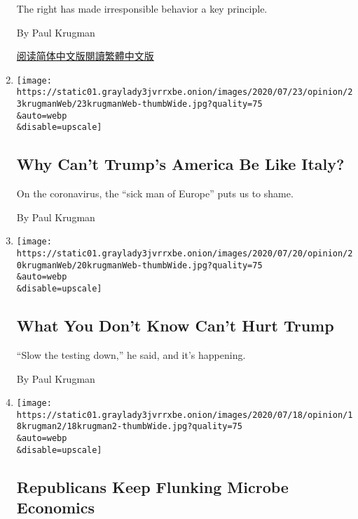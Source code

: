 \begin{enumerate}
  The right has made irresponsible behavior a key principle.

  By Paul Krugman

  \href{https://cn.nytimes3xbfgragh.onion/opinion/20200728/us-republicans-coronavirus/}{阅读简体中文版}\href{https://cn.nytimes3xbfgragh.onion/opinion/20200728/us-republicans-coronavirus/zh-hant/}{閱讀繁體中文版}
\item
  \href{/2020/07/23/opinion/us-italy-coronavirus.html}{}

  \texttt{[image: https://static01.graylady3jvrrxbe.onion/images/2020/07/23/opinion/23krugmanWeb/23krugmanWeb-thumbWide.jpg?quality=75\\\&auto=webp\\\&disable=upscale]}

  \hypertarget{why-cant-trumps-america-be-like-italy}{%
  \subsection{Why Can't Trump's America Be Like
  Italy?}\label{why-cant-trumps-america-be-like-italy}}

  On the coronavirus, the ``sick man of Europe'' puts us to shame.

  By Paul Krugman
\item
  \href{/2020/07/20/opinion/trump-coronavirus-testing.html}{}

  \texttt{[image: https://static01.graylady3jvrrxbe.onion/images/2020/07/20/opinion/20krugmanWeb/20krugmanWeb-thumbWide.jpg?quality=75\\\&auto=webp\\\&disable=upscale]}

  \hypertarget{what-you-dont-know-cant-hurt-trump}{%
  \subsection{What You Don't Know Can't Hurt
  Trump}\label{what-you-dont-know-cant-hurt-trump}}

  ``Slow the testing down,'' he said, and it's happening.

  By Paul Krugman
\item
  \href{/2020/07/18/opinion/republicans-keep-flunking-microbe-economics.html}{}

  \texttt{[image: https://static01.graylady3jvrrxbe.onion/images/2020/07/18/opinion/18krugman2/18krugman2-thumbWide.jpg?quality=75\\\&auto=webp\\\&disable=upscale]}

  \hypertarget{republicans-keep-flunking-microbe-economics}{%
  \subsection{Republicans Keep Flunking Microbe
  Economics}\label{republicans-keep-flunking-microbe-economics}}


\end{enumerate}
